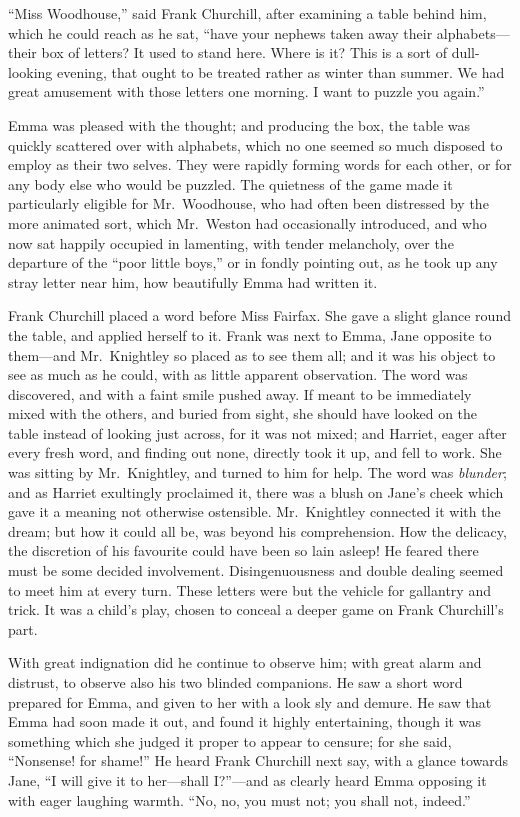 ``Miss Woodhouse,'' said Frank Churchill, after examining a table
behind him, which he could reach as he sat, ``have your nephews taken
away their alphabets---their box of letters?  It used to stand here.
Where is it?  This is a sort of dull-looking evening, that ought
to be treated rather as winter than summer.  We had great amusement
with those letters one morning.  I want to puzzle you again.''

Emma was pleased with the thought; and producing the box, the table
was quickly scattered over with alphabets, which no one seemed so much
disposed to employ as their two selves.  They were rapidly forming
words for each other, or for any body else who would be puzzled.
The quietness of the game made it particularly eligible for
Mr.\ Woodhouse, who had often been distressed by the more animated sort,
which Mr.\ Weston had occasionally introduced, and who now sat happily
occupied in lamenting, with tender melancholy, over the departure
of the ``poor little boys,'' or in fondly pointing out, as he took
up any stray letter near him, how beautifully Emma had written it.

Frank Churchill placed a word before Miss Fairfax.  She gave
a slight glance round the table, and applied herself to it.
Frank was next to Emma, Jane opposite to them---and Mr.\ Knightley
so placed as to see them all; and it was his object to see as much
as he could, with as little apparent observation.  The word
was discovered, and with a faint smile pushed away.  If meant
to be immediately mixed with the others, and buried from sight,
she should have looked on the table instead of looking just across,
for it was not mixed; and Harriet, eager after every fresh word,
and finding out none, directly took it up, and fell to work.
She was sitting by Mr.\ Knightley, and turned to him for help.
The word was \emph{blunder}; and as Harriet exultingly proclaimed it,
there was a blush on Jane's cheek which gave it a meaning not
otherwise ostensible.  Mr.\ Knightley connected it with the dream;
but how it could all be, was beyond his comprehension.
How the delicacy, the discretion of his favourite could have been
so lain asleep!  He feared there must be some decided involvement.
Disingenuousness and double dealing seemed to meet him at every turn.
These letters were but the vehicle for gallantry and trick.
It was a child's play, chosen to conceal a deeper game on Frank
Churchill's part.

With great indignation did he continue to observe him; with great
alarm and distrust, to observe also his two blinded companions.
He saw a short word prepared for Emma, and given to her with a look
sly and demure.  He saw that Emma had soon made it out, and found
it highly entertaining, though it was something which she judged it
proper to appear to censure; for she said, ``Nonsense! for shame!''
He heard Frank Churchill next say, with a glance towards Jane,
``I will give it to her---shall I?''---and as clearly heard Emma
opposing it with eager laughing warmth.  ``No, no, you must not;
you shall not, indeed.''

